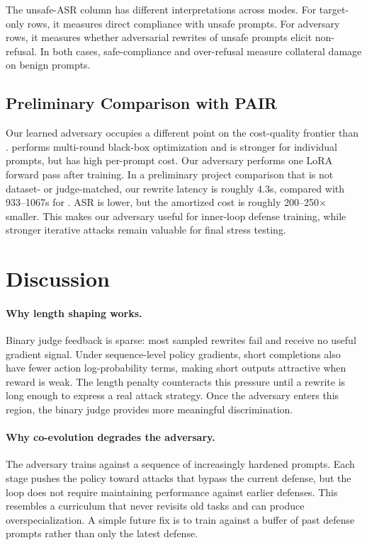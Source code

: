 The unsafe-ASR column has 
different interpretations across modes. 
For target-only rows, it measures direct compliance with unsafe \xstest{} prompts.
For adversary rows, it measures whether adversarial rewrites of \xstest{} unsafe prompts elicit non-refusal.
In both cases, safe-compliance and over-refusal measure collateral damage on benign prompts.
\subsection{Preliminary Comparison with PAIR}

Our learned adversary occupies a different point on the cost-quality frontier than \pair{}.
\pair{} performs multi-round black-box optimization and is stronger for individual prompts, but has high per-prompt cost.
Our adversary performs one LoRA forward pass after training. 
In a preliminary project comparison that is not dataset- or judge-matched, our rewrite latency is roughly 4.3s, compared with 933--1067s for \pair{}.
ASR is lower, but the amortized cost is roughly 200--250$\times$ smaller.
This makes our adversary useful for inner-loop defense training, while stronger iterative attacks remain valuable for final stress testing.
\section{Discussion}

\paragraph{Why length shaping works.}
Binary judge feedback is sparse: most sampled rewrites fail and receive no useful gradient signal.
Under sequence-level policy gradients, short completions also have fewer action log-probability terms, making short outputs attractive when reward is weak.
The length penalty counteracts this pressure until a rewrite is long enough to express a real attack strategy.
Once the adversary enters this region, the binary judge provides more meaningful discrimination.
\paragraph{Why co-evolution degrades the adversary.}
The adversary trains against a sequence of increasingly hardened prompts.
Each stage pushes the policy toward attacks that bypass the current defense, but the loop does not require maintaining performance against earlier defenses.
This resembles a curriculum that never revisits old tasks and can produce overspecialization.
A simple future fix is to train against a buffer of past defense prompts rather than only the latest defense.
